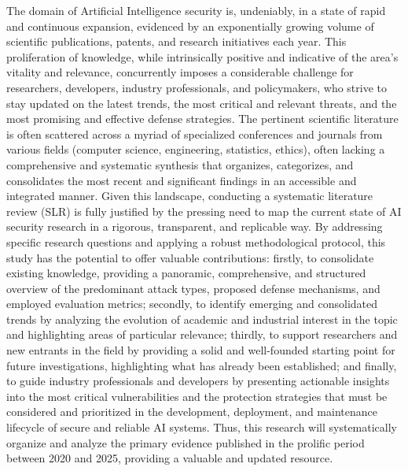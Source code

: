 \documentclass[twoside,brazilian,english]{UNISINOSmonografia}
\begin{document}
The domain of Artificial Intelligence security is, undeniably, in a state of rapid and continuous expansion, evidenced by an exponentially growing volume of scientific publications, patents, and research initiatives each year. This proliferation of knowledge, while intrinsically positive and indicative of the area's vitality and relevance, concurrently imposes a considerable challenge for researchers, developers, industry professionals, and policymakers, who strive to stay updated on the latest trends, the most critical and relevant threats, and the most promising and effective defense strategies. The pertinent scientific literature is often scattered across a myriad of specialized conferences and journals from various fields (computer science, engineering, statistics, ethics), often lacking a comprehensive and systematic synthesis that organizes, categorizes, and consolidates the most recent and significant findings in an accessible and integrated manner. Given this landscape, conducting a systematic literature review (SLR) is fully justified by the pressing need to map the current state of AI security research in a rigorous, transparent, and replicable way. By addressing specific research questions and applying a robust methodological protocol, this study has the potential to offer valuable contributions: firstly, to consolidate existing knowledge, providing a panoramic, comprehensive, and structured overview of the predominant attack types, proposed defense mechanisms, and employed evaluation metrics; secondly, to identify emerging and consolidated trends by analyzing the evolution of academic and industrial interest in the topic and highlighting areas of particular relevance; thirdly, to support researchers and new entrants in the field by providing a solid and well-founded starting point for future investigations, highlighting what has already been established; and finally, to guide industry professionals and developers by presenting actionable insights into the most critical vulnerabilities and the protection strategies that must be considered and prioritized in the development, deployment, and maintenance lifecycle of secure and reliable AI systems. Thus, this research will systematically organize and analyze the primary evidence published in the prolific period between 2020 and 2025, providing a valuable and updated resource.

\end{document}
